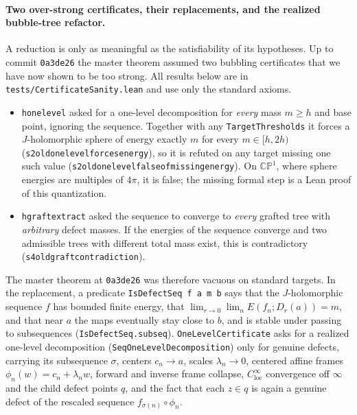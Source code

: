 \documentclass[11pt]{article}
\renewcommand{\_}{\origus\allowbreak}
\newcommand{\CP}{\mathbb{CP}^1}
\newcommand{\code}[1]{\texttt{#1}}
\begin{document}
\paragraph{Two over-strong certificates, their replacements, and the realized bubble-tree refactor.}
A reduction is only as meaningful as the satisfiability of its hypotheses. Up to commit
\code{0a3de26} the master theorem assumed two bubbling certificates that we have now shown to be too
strong. All results below are in \code{tests/CertificateSanity.lean} and use only the standard axioms.
\begin{itemize}
\item \code{h\_one\_level} asked for a one-level decomposition for \emph{every} mass $m\ge h$ and
  base point, ignoring the sequence. Together with any \code{TargetThresholds} it forces a
  $J$-holomorphic sphere of energy exactly $m$ for every $m\in[h,2h)$
  (\code{s2\_old\_one\_level\_forces\_energy}), so it is refuted on any target missing one such value
  (\code{s2\_old\_one\_level\_false\_of\_missing\_energy}). On $\CP$, where sphere energies are
  multiples of $4\pi$, it is false; the missing formal step is a Lean proof of this quantization.
\item \code{h\_graft\_extract} asked the sequence to converge to \emph{every} grafted tree with
  \emph{arbitrary} defect masses. If the energies of the sequence converge and two admissible trees
  with different total mass exist, this is contradictory (\code{s4\_old\_graft\_contradiction}).
\end{itemize}
The master theorem at \code{0a3de26} was therefore vacuous on standard targets. In the replacement,
a predicate \code{IsDefectSeq f a m b} says that the $J$-holomorphic sequence $f$ has bounded finite
energy, that $\lim_{r\to0}\lim_n E(f_n;D_r(a))=m$, and that near $a$ the maps eventually stay close
to $b$, and is stable under passing to subsequences (\code{IsDefectSeq.subseq}).
\code{OneLevelCertificate} asks for a realized one-level decomposition (\code{SeqOneLevelDecomposition})
only for genuine defects, carrying its subsequence $\sigma$, centers $c_n\to a$, scales
$\lambda_n\to 0$, centered affine frames $\phi_n(w)=c_n+\lambda_n w$, forward and inverse frame
collapse, $C^\infty_{\mathrm{loc}}$ convergence off $\infty$ and the child defect points $q$, and
the fact that each $z\in q$ is again a genuine defect of the rescaled sequence $f_{\sigma(n)}\circ\phi_n$.
\end{document}
